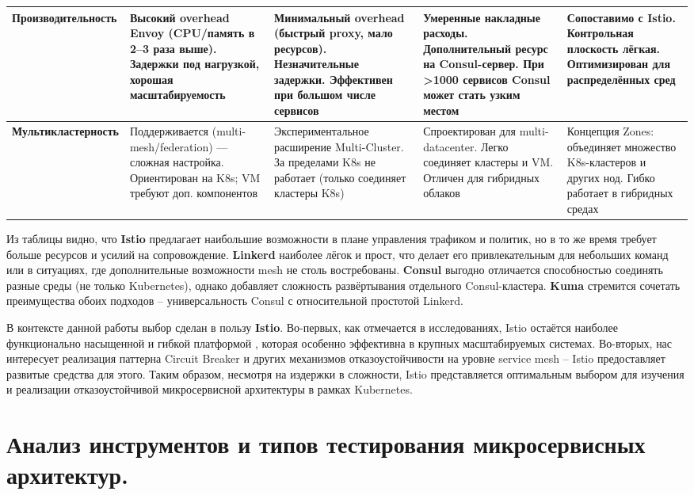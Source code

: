 \begin{longtable}{|p{2.6cm}|p{3.3cm}|p{3.3cm}|p{3.3cm}|p{3.3cm}|}
\textbf{Произво\-ди\-тель\-ность} & 
Высокий overhead Envoy (CPU/память в 2–3 раза выше). Задержки под нагрузкой\cite{bremler2024performance}, хорошая масштабируемость & 
Минимальный overhead (быстрый proxy, мало ресурсов). Незначительные задержки. Эффективен при большом числе сервисов & 
Умеренные накладные расходы. Дополнительный ресурс на Consul-сервер. При >1000 сервисов Consul может стать узким местом & 
Сопоставимо с Istio. Контрольная плоскость лёгкая. Оптимизирован для распределённых сред \\
\hline


\textbf{Мульти\-клас\-тер\-ность
} & 
Поддерживается (multi-mesh/federation) — сложная настройка. Ориентирован на K8s; VM требуют доп. компонентов & 
Экспериментальное расширение Multi-Cluster. За пределами K8s не работает (только соединяет кластеры K8s) & 
Спроектирован для multi-datacenter. Легко соединяет кластеры и VM. Отличен для гибридных облаков & 
Концепция Zones: объединяет множество K8s-кластеров и других нод. Гибко работает в гибридных средах \\
\hline
\end{longtable}
\endgroup

Из таблицы видно, что \textbf{Istio} предлагает наибольшие возможности в плане управления трафиком и политик, но в то же время требует больше ресурсов и усилий на сопровождение. \textbf{Linkerd} наиболее лёгок и прост, что делает его привлекательным для небольших команд или в ситуациях, где дополнительные возможности mesh не столь востребованы. \textbf{Consul} выгодно отличается способностью соединять разные среды (не только Kubernetes), однако добавляет сложность развёртывания отдельного Consul-кластера. \textbf{Kuma} стремится сочетать преимущества обоих подходов – универсальность Consul с относительной простотой Linkerd.

В контексте данной работы выбор сделан в пользу \textbf{Istio}. Во-первых, как отмечается в исследованиях, Istio остаётся наиболее функционально насыщенной и гибкой платформой​ \cite{palavesam2025}, которая особенно эффективна в крупных масштабируемых системах. Во-вторых, нас интересует реализация паттерна Circuit Breaker и других механизмов отказоустойчивости на уровне service mesh – Istio предоставляет развитые средства для этого. Таким образом, несмотря на издержки в сложности, Istio представляется оптимальным выбором для изучения и реализации отказоустойчивой микросервисной архитектуры в рамках Kubernetes.

\section{Анализ инструментов и типов тестирования микросервисных архитектур.}

